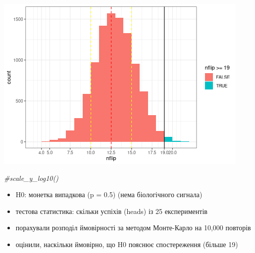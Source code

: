 \documentclass[
  10pt,
]{article}
\newenvironment{Shaded}{\begin{snugshade}}{\end{snugshade}}
\newcommand{\AttributeTok}[1]{\textcolor[rgb]{0.13,0.29,0.53}{#1}}
\newcommand{\CommentTok}[1]{\textcolor[rgb]{0.56,0.35,0.01}{\textit{#1}}}
\newcommand{\DecValTok}[1]{\textcolor[rgb]{0.00,0.00,0.81}{#1}}
\newcommand{\FloatTok}[1]{\textcolor[rgb]{0.00,0.00,0.81}{#1}}
\newcommand{\FunctionTok}[1]{\textcolor[rgb]{0.13,0.29,0.53}{\textbf{#1}}}
\newcommand{\NormalTok}[1]{#1}
\newcommand{\SpecialCharTok}[1]{\textcolor[rgb]{0.81,0.36,0.00}{\textbf{#1}}}
\providecommand{\tightlist}{%
  \setlength{\itemsep}{0pt}\setlength{\parskip}{0pt}}
\begin{document}
\begin{Shaded}
\end{Shaded}

\includegraphics{05.pvalues_files/figure-latex/unnamed-chunk-5-1.png}

\begin{Shaded}
\begin{Highlighting}[]
\CommentTok{\#scale\_y\_log10()}
\end{Highlighting}
\end{Shaded}

\begin{itemize}
\tightlist
\item
  H0: монетка випадкова (p = 0.5) (нема біологічного сигнала)
\item
  тестова статистика: скільки успіхів (heads) із 25 експериментів
\item
  порахували розподіл ймовірності за методом Монте-Карло на 10,000
  повторів
\item
  оцінили, наскільки ймовірно, що H0 пояснює спостереження (більше 19)
\end{itemize}
\end{document}
